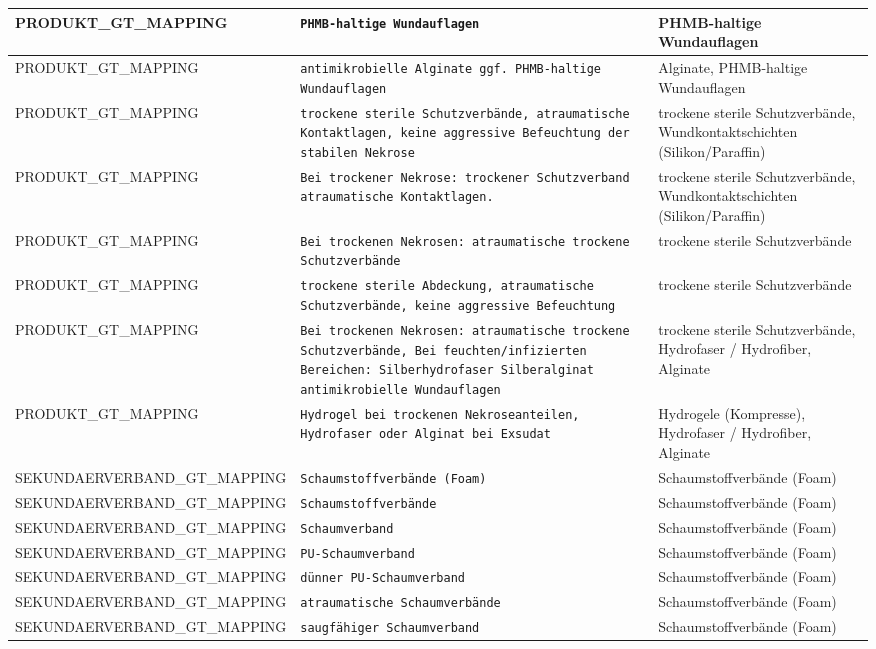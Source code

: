 \begin{longtable}{|p{3.5cm}|p{5cm}|p{6.5cm}|}
PRODUKT\_GT\_MAPPING & \texttt{PHMB-haltige Wundauflagen} & PHMB-haltige Wundauflagen \\ \hline
PRODUKT\_GT\_MAPPING & \texttt{antimikrobielle Alginate ggf. PHMB-haltige Wundauflagen} & Alginate, PHMB-haltige Wundauflagen \\ \hline
PRODUKT\_GT\_MAPPING & \texttt{trockene sterile Schutzverbände, atraumatische Kontaktlagen, keine aggressive Befeuchtung der stabilen Nekrose} & trockene sterile Schutzverbände, Wundkontaktschichten (Silikon/Paraffin) \\ \hline
PRODUKT\_GT\_MAPPING & \texttt{Bei trockener Nekrose: trockener Schutzverband atraumatische Kontaktlagen.} & trockene sterile Schutzverbände, Wundkontaktschichten (Silikon/Paraffin) \\ \hline
PRODUKT\_GT\_MAPPING & \texttt{Bei trockenen Nekrosen: atraumatische trockene Schutzverbände} & trockene sterile Schutzverbände \\ \hline
PRODUKT\_GT\_MAPPING & \texttt{trockene sterile Abdeckung, atraumatische Schutzverbände, keine aggressive Befeuchtung} & trockene sterile Schutzverbände \\ \hline
PRODUKT\_GT\_MAPPING & \texttt{Bei trockenen Nekrosen: atraumatische trockene Schutzverbände, Bei feuchten/infizierten Bereichen: Silberhydrofaser Silberalginat antimikrobielle Wundauflagen} & trockene sterile Schutzverbände, Hydrofaser / Hydrofiber, Alginate \\ \hline
PRODUKT\_GT\_MAPPING & \texttt{Hydrogel bei trockenen Nekroseanteilen, Hydrofaser oder Alginat bei Exsudat} & Hydrogele (Kompresse), Hydrofaser / Hydrofiber, Alginate \\ \hline
SEKUNDAERVERBAND\_GT\_MAPPING & \texttt{Schaumstoffverbände (Foam)} & Schaumstoffverbände (Foam) \\ \hline
SEKUNDAERVERBAND\_GT\_MAPPING & \texttt{Schaumstoffverbände} & Schaumstoffverbände (Foam) \\ \hline
SEKUNDAERVERBAND\_GT\_MAPPING & \texttt{Schaumverband} & Schaumstoffverbände (Foam) \\ \hline
SEKUNDAERVERBAND\_GT\_MAPPING & \texttt{PU-Schaumverband} & Schaumstoffverbände (Foam) \\ \hline
SEKUNDAERVERBAND\_GT\_MAPPING & \texttt{dünner PU-Schaumverband} & Schaumstoffverbände (Foam) \\ \hline
SEKUNDAERVERBAND\_GT\_MAPPING & \texttt{atraumatische Schaumverbände} & Schaumstoffverbände (Foam) \\ \hline
SEKUNDAERVERBAND\_GT\_MAPPING & \texttt{saugfähiger Schaumverband} & Schaumstoffverbände (Foam) \\ \hline

\end{longtable}
